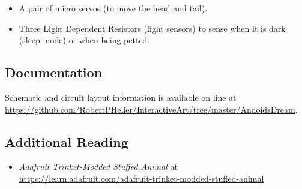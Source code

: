 \begin{itemize}
\item A pair of micro servos (to move the head and tail).
\item Three Light Dependent Resistors (light sensors) to sense when it is dark
(sleep mode) or when being petted.
\end{itemize}

\subsection*{Documentation}

Schematic and circuit layout information is available on line at 
\url{https://github.com/RobertPHeller/InteractiveArt/tree/master/AndoidsDream}.

\subsection*{Additional Reading}

\begin{itemize}
\item \textit{Adafruit Trinket-Modded Stuffed Animal} at 
\url{https://learn.adafruit.com/adafruit-trinket-modded-stuffed-animal} 
\end{itemize}

